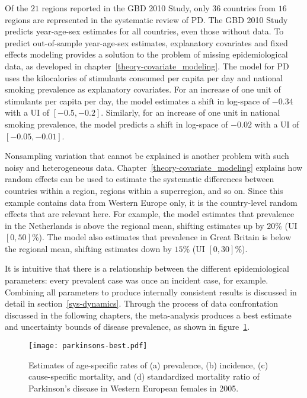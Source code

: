 Of the $21$ regions reported in the GBD 2010 Study, only $36$ countries
from $16$ regions are represented in the systematic review of PD.  The GBD
2010 Study predicts year-age-sex estimates for all countries, even
those without data.  To predict out-of-sample year-age-sex estimates,
explanatory covariates and fixed effects modeling provides
a solution to the problem of missing epidemiological data,
as developed in chapter~\ref{theory-covariate_modeling}.  The model for PD uses the
kilocalories of stimulants consumed per capita per day and national smoking prevalence
as explanatory covariates.  For an increase of one unit of stimulants per
capita per day, the model estimates a shift in log-space of $-0.34$
with a UI of $[-0.5, -0.2]$.  Similarly, for an increase of one unit in national
smoking prevalence, the model predicts a shift in log-space of $-0.02$ with a UI
of $[-0.05, -0.01]$.

Nonsampling variation that cannot be explained is another problem with
such noisy and heterogeneous data.  Chapter~\ref{theory-covariate_modeling}
explains how random effects can be used
to estimate the systematic differences between countries within a
region, regions within a superregion, and so on.  Since this example
contains data from Western Europe only, it is the country-level random
effects that are relevant here.  For example, the model estimates that
prevalence in the Netherlands is above the regional mean, shifting
estimates up by $20\%$ (UI $[0, 50]$\%).  The model also estimates
that prevalence in Great Britain is below the regional mean, shifting estimates
down by $15\%$ (UI $[0, 30]\%$).

It is intuitive that there is a relationship between the
different epidemiological parameters: every prevalent case was once an incident
case, for example.  Combining all parameters to produce internally
consistent results is discussed in detail in section~\ref{sys-dynamics}.
Through the process of data confrontation
discussed in the following chapters, the meta-analysis produces a best
estimate and uncertainty bounds of disease prevalence, as shown in
figure~\ref{fig:intro-parkinsons fit}.

    \begin{figure}[h]
        \begin{center}
            \texttt{[image: parkinsons-best.pdf]}
            \caption[Estimates of age-specific rates for Parkinson's disease.]{Estimates
              of age-specific rates of
              (a) prevalence, (b) incidence,
              (c) cause-specific mortality, and
              (d) standardized mortality ratio of Parkinson's
              disease in Western European females in 2005.}
            \label{fig:intro-parkinsons fit}
        \end{center}
    \end{figure} 
